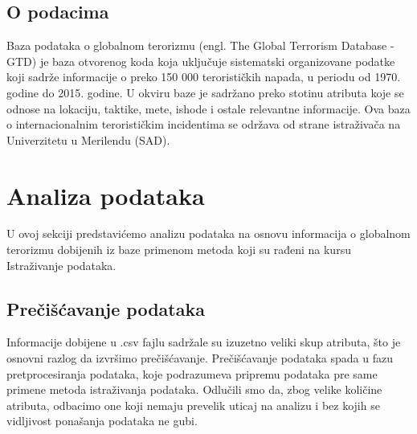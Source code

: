 \documentclass[a4paper]{article}
\begin{document}
\subsection{O podacima}
Baza podataka o globalnom terorizmu (engl. The Global Terrorism Database - GTD) je baza otvorenog koda koja uključuje sistematski organizovane podatke koji sadrže informacije o preko 150 000 terorističkih napada, u periodu od 1970. godine do 2015. godine. U okviru baze je sadržano preko stotinu atributa koje se odnose na lokaciju, taktike, mete, ishode i ostale relevantne informacije. Ova baza o internacionalnim terorističkim incidentima se održava od strane istraživača na Univerzitetu u Merilendu (SAD).

\section{Analiza podataka}
\label{sec:analiza}

U ovoj sekciji predstavićemo analizu podataka na osnovu informacija o globalnom terorizmu dobijenih iz baze primenom metoda koji su rađeni na kursu Istraživanje podataka. 

\subsection{Prečišćavanje podataka}

Informacije dobijene u .csv fajlu sadržale su izuzetno veliki skup atributa, što je osnovni razlog da izvršimo prečišćavanje. Prečišćavanje podataka spada u fazu pretprocesiranja podataka, koje podrazumeva pripremu podataka pre same primene metoda istraživanja podataka. Odlučili smo da, zbog velike količine atributa, odbacimo one koji nemaju prevelik uticaj na analizu i bez kojih se vidljivost ponašanja podataka ne gubi.
\end{document}

